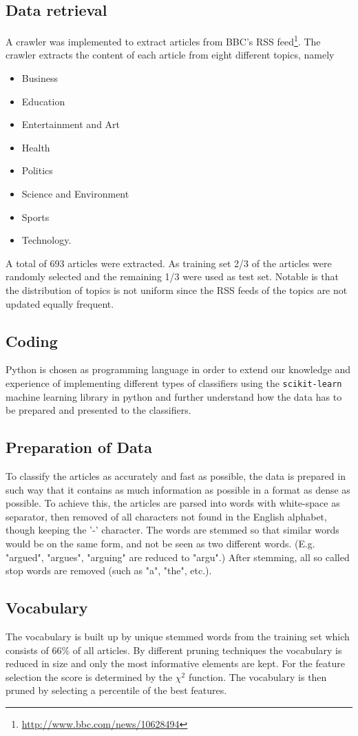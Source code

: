 \subsection{Data retrieval}
A crawler was implemented to extract articles from BBC's RSS feed\footnote{\url{http://www.bbc.com/news/10628494}}. The crawler extracts the content of each article from eight different topics, namely
\begin{itemize}[noitemsep,nolistsep]
	\item Business
	\item Education
	\item Entertainment and Art
	\item Health
	\item Politics
	\item Science and Environment
	\item Sports
	\item Technology.
\end{itemize}
A total of 693 articles were extracted. As training set 2/3 of the articles were randomly selected and the remaining 1/3 were used as test set. Notable is that the distribution of topics is not uniform since the RSS feeds of the topics are not updated equally frequent. 
\subsection{Coding}
Python is chosen as programming language in order to extend our knowledge and experience of implementing different types of classifiers using the \texttt{scikit-learn} machine learning library in python and further understand how the data has to be prepared and presented to the classifiers.
\subsection{Preparation of Data}
To classify the articles as accurately and fast as possible, the data is prepared in such way that it contains as much information as possible in a format as dense as possible. To achieve this, the articles are parsed into words with white-space as separator, then removed of all characters not found in the English alphabet, though keeping the '-' character. The words are stemmed so that similar words would be on the same form, and not be seen as two different words. (E.g. "argued", "argues", "arguing" are reduced to "argu".) After stemming, all so called stop words are removed (such as "a", "the", etc.). 
\subsection{Vocabulary}
The vocabulary is built up by unique stemmed words from the training set which consists of 66\% of all articles. By different pruning techniques the vocabulary is reduced in size and only the most informative elements are kept. For the feature selection the score is determined by the $\chi^2$ function. The vocabulary is then pruned by selecting a percentile of the best features.
